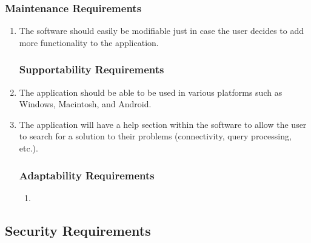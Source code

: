 \documentclass[]{article}
\begin{document}
\subsubsection{Maintenance Requirements}
\label{ssub:maintenance_requirements}
\begin{enumerate}[{MS}1. ]
	\item The software should easily be modifiable just in case the user decides to add more functionality to the application.

\subsubsection{Supportability Requirements}
\label{ssub:supportability_requirements}
	\item The application should be able to be used in various platforms such as Windows, Macintosh, and Android.
	\item The application will have a help section within the software to allow the user to search for a solution to their problems (connectivity, query processing, etc.).

\subsubsection{Adaptability Requirements}
\label{ssub:adaptability_requirements}
\begin{enumerate}[{N/A} ]
	\item
\end{enumerate}
\end{enumerate}


\subsection{Security Requirements}
\label{sub:security_requirements}
\end{document}
